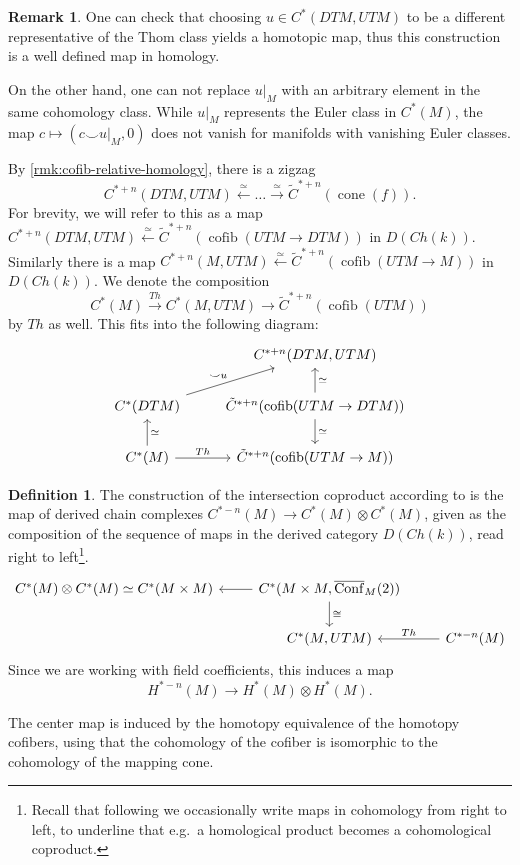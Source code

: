 \documentclass{scrartcl}
\theoremstyle{plain}
\theoremstyle{definition}
\newtheorem{definition}[theorem]{Definition}
\newtheorem{remark}[theorem]{Remark}
\newcommand{\cupp}{\mathbin{\smile}}
\DeclareMathOperator{\cone}{cone}
\DeclareMathOperator{\cofib}{cofib}
\newcommand{\iso}{\cong}
\newcommand{\quiso}{\simeq}
\let\xto\xrightarrow
\let\xfrom\xleftarrow
\DeclareMathOperator{\cConf}{\overline{Conf}}
\begin{document}
\begin{remark}
    One can check that choosing $u\in C^*(DTM, UTM)$ to be a different representative of the Thom class yields a homotopic map, thus this construction is a well defined map in homology. 

    On the other hand, one can not replace $u|_M$ with an arbitrary element in the same cohomology class. While $u|_M$ represents the Euler class in $C^*(M)$, the map $c\mapsto (c\cupp u|_M, 0)$ does not vanish for manifolds with vanishing Euler classes.
\end{remark}


By \cref{rmk:cofib-relative-homology}, there is a zigzag $$
C^{*+n}(DTM, UTM) \xfrom{\quiso} \dots \xto{\quiso} \tilde C^{*+n}(\cone(f)).$$ For brevity, we will refer to this as a map $C^{*+n}(DTM, UTM) \xfrom{\quiso} \tilde C^{*+n}(\cofib(UTM\to DTM))$ in $D(Ch(k))$. Similarly there is a map $C^{*+n}(M, UTM) \xfrom{\quiso} \tilde C^{*+n}(\cofib(UTM\to M))$ in $D(Ch(k))$. We denote the composition $$C^*(M)\xto{Th} C^*(M, UTM) \to \tilde C^{*+n}(\cofib(UTM))$$ by $Th$ as well. This fits into the following diagram:
\begin{equation}
    \begin{tikzcd}\label{diag:Th-map}
      & C^{*+n}(DTM, UTM) \\
      C^*(DTM) \ar[ur, "\cupp u"] & \tilde C^{*+n}(\cofib(UTM \to DTM)) \uar[swap, "\quiso"]\dar["\quiso"]\\
    C^*(M) \ar[u, swap, "\quiso"]\rar["Th"] & \tilde C^{*+n}(\cofib(UTM\to M))
\end{tikzcd}
\end{equation}

\begin{definition}
The construction of the intersection coproduct according to \cite{naef2019string} is the map of derived chain complexes $C^{*-n}(M)\to C^*(M)\otimes C^*(M)$, given as the composition of the sequence of maps in the derived category $D(Ch(k))$, read right to left\footnote{Recall that following \cite{naef2019string} we occasionally write maps in cohomology from right to left, to underline that e.g.\ a homological product becomes a cohomological coproduct. }.
\begin{equation*}
\begin{tikzcd}
    C^*(M)\otimes C^*(M) \quiso C^*(M\times M) & \lar C^*(M\times M, \cConf_M(2)) \dar["\iso"] & \ \\
    & C^*(M, UTM)& \lar[swap, "Th"] C^{*-n}(M)
\end{tikzcd}
\end{equation*}
Since we are working with field coefficients, this induces a map $$H^{*-n}(M)\to H^*(M) \otimes H^*(M).$$
\end{definition}
The center map is induced by the homotopy equivalence of the homotopy cofibers, using that the cohomology of the cofiber is isomorphic to the cohomology of the mapping cone. 
\end{document}
